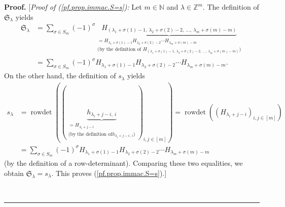 \documentclass[numbers=enddot,12pt,final,onecolumn,notitlepage,english]{scrartcl}%
\theoremstyle{definition}
\newenvironment{proof}[1][Proof]{\noindent\textbf{#1.} }{\ \rule{0.5em}{0.5em}}
\let\sumnonlimits\sum
\renewcommand{\sum}{\sumnonlimits\limits}
\newenvironment{verlong}{}{}
\begin{document}
\begin{proof}
\begin{verlong}
[\textit{Proof of (\ref{pf.prop.immac.S=s}):} Let $m\in\mathbb{N}$ and
$\lambda\in\mathbb{Z}^{m}$. The definition of $\mathfrak{S}_{\lambda}$ yields%
\begin{align*}
\mathfrak{S}_{\lambda}  &  =\sum_{\sigma\in S_{m}}\left(  -1\right)  ^{\sigma
}\underbrace{H_{\left(  \lambda_{1}+\sigma\left(  1\right)  -1,\ \lambda
_{2}+\sigma\left(  2\right)  -2,\ \ldots,\ \lambda_{m}+\sigma\left(  m\right)
-m\right)  }}_{\substack{=H_{\lambda_{1}+\sigma\left(  1\right)  -1}%
H_{\lambda_{2}+\sigma\left(  2\right)  -2}\cdots H_{\lambda_{m}+\sigma\left(
m\right)  -m}\\\text{(by the definition of }H_{\left(  \lambda_{1}%
+\sigma\left(  1\right)  -1,\ \lambda_{2}+\sigma\left(  2\right)
-2,\ \ldots,\ \lambda_{m}+\sigma\left(  m\right)  -m\right)  }\text{)}}}\\
&  =\sum_{\sigma\in S_{m}}\left(  -1\right)  ^{\sigma}H_{\lambda_{1}%
+\sigma\left(  1\right)  -1}H_{\lambda_{2}+\sigma\left(  2\right)  -2}\cdots
H_{\lambda_{m}+\sigma\left(  m\right)  -m}.
\end{align*}
On the other hand, the definition of $s_{\lambda}$ yields%
\begin{align*}
s_{\lambda}  &  =\operatorname*{rowdet}\left(  \left(  \underbrace{h_{\lambda
_{i}+j-i,\ i}}_{\substack{=H_{\lambda_{i}+j-i}\\\text{(by the definition of
}h_{\lambda_{i}+j-i,\ i}\text{)}}}\right)  _{i,j\in\left[  m\right]  }\right)
=\operatorname*{rowdet}\left(  \left(  H_{\lambda_{i}+j-i}\right)
_{i,j\in\left[  m\right]  }\right) \\
&  =\sum_{\sigma\in S_{m}}\left(  -1\right)  ^{\sigma}H_{\lambda_{1}%
+\sigma\left(  1\right)  -1}H_{\lambda_{2}+\sigma\left(  2\right)  -2}\cdots
H_{\lambda_{m}+\sigma\left(  m\right)  -m}%
\end{align*}
(by the definition of a row-determinant). Comparing these two equalities, we
obtain $\mathfrak{S}_{\lambda}=s_{\lambda}$. This proves
(\ref{pf.prop.immac.S=s}).] \medskip
\end{verlong}


\end{proof}
\end{document}
